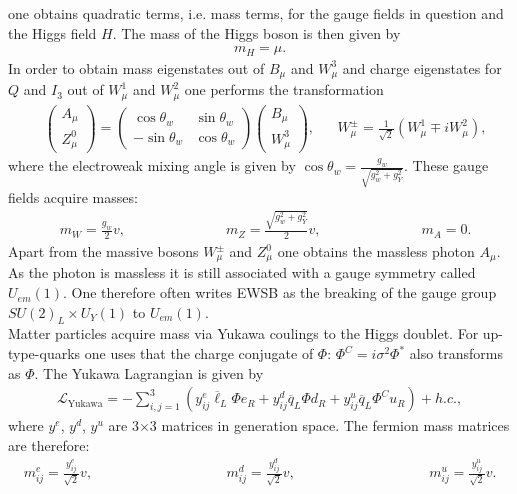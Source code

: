 one obtains quadratic terms, i.e. mass terms, for the gauge fields in question and the Higgs field $H$. The mass of the Higgs boson is then given by
\begin{align}
m_H = \mu.
\end{align}
In order to obtain mass eigenstates out of $B_\mu$ and $W_\mu^3$ and charge eigenstates for $Q$ and $I_3$ out of $W_\mu^1$ and $W_\mu^2$ one performs the transformation
\begin{align}
&\begin{pmatrix}
A_\mu \\
Z^0_\mu
\end{pmatrix} = \begin{pmatrix}
\cos \theta_w & \sin \theta_w \\
-\sin \theta_w & \cos \theta_w
\end{pmatrix} \begin{pmatrix}
B_\mu \\
W^3_\mu
\end{pmatrix},
&& W^{\pm}_\mu = \frac{1}{\sqrt{2}}(W^1_\mu \mp i W^2_\mu),
\end{align}
where the electroweak mixing angle is given by $\cos\theta_w = \frac{g_w}{\sqrt{g_w^2 + g_Y^2}}$.
These gauge fields acquire masses:
\begin{align}
& m_W = \frac{g_w}{2} v, \hspace{3cm} m_Z = \frac{\sqrt{g_w^2+g_Y^2}}{2} v, \hspace{3cm} m_A = 0.
\end{align}
Apart from the massive bosons $W^\pm_\mu$ and $Z^0_\mu$ one obtains the massless photon $A_\mu$. As the photon is massless it is still associated with a gauge symmetry called $U_{em}(1)$. One therefore often writes EWSB as the breaking of the gauge group $SU(2)_L \times U_Y(1)$ to $U_{em}(1)$.\\
Matter particles acquire mass via Yukawa coulings to the Higgs doublet. For up-type-quarks one uses that the charge conjugate of $\Phi$: $\Phi^C = i \sigma^2 \Phi^\ast$ also transforms as $\Phi$. The Yukawa Lagrangian is given by
\begin{align}
\mathcal{L}_{\mathrm{Yukawa}} = -\sum_{i,j=1}^3 \left( y_{ij}^e \overline{\ell}_L \Phi e_R  + y_{ij}^d \overline{q}_L \Phi d_R + y_{ij}^u \overline{q}_L \Phi^C u_R\right) + h.c., \label{eq:LYukawa}
\end{align}
where $y^e$, $y^d$, $y^u$ are 3$\times$3 matrices in generation space. The fermion mass matrices are therefore:
\begin{align}
m^e_{ij} = \frac{y^e_{ij}}{\sqrt{2}} v,  \hspace{4cm} m^d_{ij} = \frac{y^d_{ij}}{\sqrt{2}} v, \hspace{4cm} m^u_{ij} = \frac{y^u_{ij}}{\sqrt{2}} v.
\end{align}

